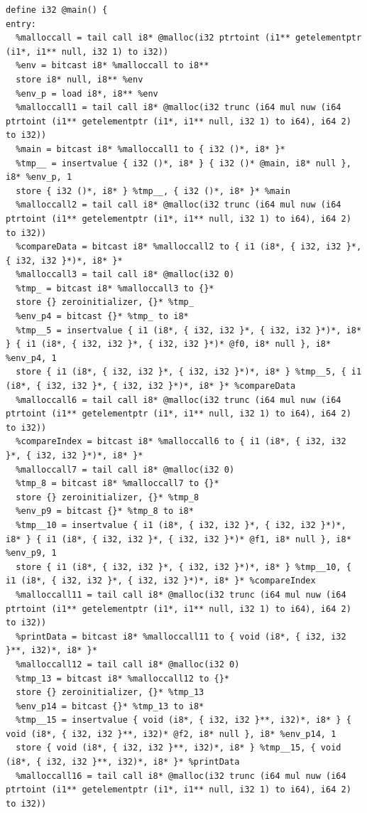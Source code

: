 \documentclass[12pt]{article}
\begin{document}
\begin{mdframed}[hidealllines=true,backgroundcolor=green!10]
\begin{lstlisting}
define i32 @main() {
entry:
  %malloccall = tail call i8* @malloc(i32 ptrtoint (i1** getelementptr (i1*, i1** null, i32 1) to i32))
  %env = bitcast i8* %malloccall to i8**
  store i8* null, i8** %env
  %env_p = load i8*, i8** %env
  %malloccall1 = tail call i8* @malloc(i32 trunc (i64 mul nuw (i64 ptrtoint (i1** getelementptr (i1*, i1** null, i32 1) to i64), i64 2) to i32))
  %main = bitcast i8* %malloccall1 to { i32 ()*, i8* }*
  %tmp__ = insertvalue { i32 ()*, i8* } { i32 ()* @main, i8* null }, i8* %env_p, 1
  store { i32 ()*, i8* } %tmp__, { i32 ()*, i8* }* %main
  %malloccall2 = tail call i8* @malloc(i32 trunc (i64 mul nuw (i64 ptrtoint (i1** getelementptr (i1*, i1** null, i32 1) to i64), i64 2) to i32))
  %compareData = bitcast i8* %malloccall2 to { i1 (i8*, { i32, i32 }*, { i32, i32 }*)*, i8* }*
  %malloccall3 = tail call i8* @malloc(i32 0)
  %tmp_ = bitcast i8* %malloccall3 to {}*
  store {} zeroinitializer, {}* %tmp_
  %env_p4 = bitcast {}* %tmp_ to i8*
  %tmp__5 = insertvalue { i1 (i8*, { i32, i32 }*, { i32, i32 }*)*, i8* } { i1 (i8*, { i32, i32 }*, { i32, i32 }*)* @f0, i8* null }, i8* %env_p4, 1
  store { i1 (i8*, { i32, i32 }*, { i32, i32 }*)*, i8* } %tmp__5, { i1 (i8*, { i32, i32 }*, { i32, i32 }*)*, i8* }* %compareData
  %malloccall6 = tail call i8* @malloc(i32 trunc (i64 mul nuw (i64 ptrtoint (i1** getelementptr (i1*, i1** null, i32 1) to i64), i64 2) to i32))
  %compareIndex = bitcast i8* %malloccall6 to { i1 (i8*, { i32, i32 }*, { i32, i32 }*)*, i8* }*
  %malloccall7 = tail call i8* @malloc(i32 0)
  %tmp_8 = bitcast i8* %malloccall7 to {}*
  store {} zeroinitializer, {}* %tmp_8
  %env_p9 = bitcast {}* %tmp_8 to i8*
  %tmp__10 = insertvalue { i1 (i8*, { i32, i32 }*, { i32, i32 }*)*, i8* } { i1 (i8*, { i32, i32 }*, { i32, i32 }*)* @f1, i8* null }, i8* %env_p9, 1
  store { i1 (i8*, { i32, i32 }*, { i32, i32 }*)*, i8* } %tmp__10, { i1 (i8*, { i32, i32 }*, { i32, i32 }*)*, i8* }* %compareIndex
  %malloccall11 = tail call i8* @malloc(i32 trunc (i64 mul nuw (i64 ptrtoint (i1** getelementptr (i1*, i1** null, i32 1) to i64), i64 2) to i32))
  %printData = bitcast i8* %malloccall11 to { void (i8*, { i32, i32 }**, i32)*, i8* }*
  %malloccall12 = tail call i8* @malloc(i32 0)
  %tmp_13 = bitcast i8* %malloccall12 to {}*
  store {} zeroinitializer, {}* %tmp_13
  %env_p14 = bitcast {}* %tmp_13 to i8*
  %tmp__15 = insertvalue { void (i8*, { i32, i32 }**, i32)*, i8* } { void (i8*, { i32, i32 }**, i32)* @f2, i8* null }, i8* %env_p14, 1
  store { void (i8*, { i32, i32 }**, i32)*, i8* } %tmp__15, { void (i8*, { i32, i32 }**, i32)*, i8* }* %printData
  %malloccall16 = tail call i8* @malloc(i32 trunc (i64 mul nuw (i64 ptrtoint (i1** getelementptr (i1*, i1** null, i32 1) to i64), i64 2) to i32))

\end{lstlisting}
\end{mdframed}
\end{document}
